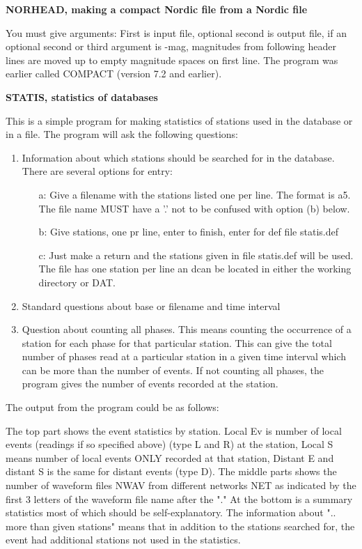 \textbf{NORHEAD, making a compact Nordic file from a Nordic file}

You must give arguments: First is input file, optional second is 
output file, if an optional second or third argument is -mag, 
magnitudes from following header lines are moved up to empty 
magnitude spaces on first line. The program was earlier called 
COMPACT (version 7.2 and earlier).

\textbf{STATIS, statistics of databases}

This is a simple program for making statistics of stations used in the database or in a file. The program will ask the following questions: 

\begin{enumerate}
\item
Information about which stations should be searched for in the database. There are several options for entry: 
\begin{itemize}
\item[a:]
Give a filename with the stations listed one per line. The format is a5. The file name MUST have a '.' not to be confused with option (b) below. 
\item[b:]
Give stations, one pr line, enter to finish, enter for def file statis.def
\item[c:]
Just make a return and the stations
given in file statis.def will be used. The file has one station per line an dcan be located in either the working directory or DAT. 
\end{itemize}
\item
 Standard questions about base or filename and time interval 
\item
Question about counting all phases. This means counting the occurrence of a station for each phase for that particular station. This can give the total number of phases read at a particular station in a given time interval which can be more than the number of events. If not counting all phases, the program gives the number of events recorded at the station. 
\end{enumerate}

The output from the program could be as follows: 



The top part shows the event statistics by station. Local Ev is number of local events (readings if so specified above) (type L and R) at the station, Local S means number of local events ONLY recorded at that station, Distant E and distant S is the same for distant events (type D). The middle parts shows the number of waveform files NWAV from different networks NET as indicated by the first 3 letters of the waveform file name after the "." At the bottom is a summary statistics most of which should be self-explanatory. The information about ".. more than given stations" means that in addition to the stations searched for, the event had additional stations not used in the statistics. 

